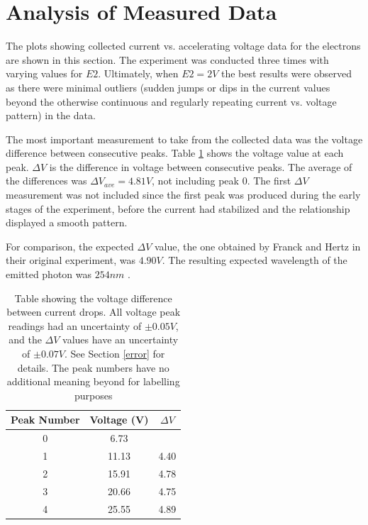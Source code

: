 \documentclass[12pt,twocolumn,letterpaper]{article}
\begin{document}
\section{Analysis of Measured Data} \label{analysis}
The plots showing collected current vs. accelerating voltage data for the electrons are shown in this section. The experiment was conducted three times with varying values for $E2$. Ultimately, when $E2=2V$ the best results were observed as there were minimal outliers (sudden jumps or dips in the current values beyond the otherwise continuous and regularly repeating current vs. voltage pattern) in the data.

The most important measurement to take from the collected data was the voltage difference between consecutive peaks. Table \ref{peaks} shows the voltage value at each peak. $\Delta V$ is the difference in voltage between consecutive peaks. The average of the differences was $\Delta V_{ave} = 4.81 V$, not including peak 0. The first $\Delta V$ measurement was not included since the first peak was produced during the early stages of the experiment, before the current had stabilized and the relationship displayed a smooth pattern.

For comparison, the expected $\Delta V$ value, the one obtained by Franck and Hertz in their original experiment, was $4.90V$. The resulting expected wavelength of the emitted photon was $254 nm$ \cite{franckhertzedu}. 

\begin{table} %
\begin{center}
\begin{tabular}{|c c c|} 

 \hline
 Peak Number & Voltage (V) & $\Delta V$\\ [0.5ex] 
 \hline\hline
 0 & 6.73 & \\ 
 \hline
 1 & 11.13 &  4.40\\
 \hline
 2 & 15.91 &  4.78\\
 \hline
 3 & 20.66 & 4.75 \\
 \hline
 4 & 25.55 & 4.89 \\
 \hline

\end{tabular}
\caption{Table showing the voltage difference between current drops. All voltage peak readings had an uncertainty of $\pm 0.05V$, and the $\Delta V$ values have an uncertainty of $\pm 0.07V$. See Section \ref{error} for details. The peak numbers have no additional meaning beyond for labelling purposes}
\label{peaks}
\end{center}
\end{table}
\end{document}
